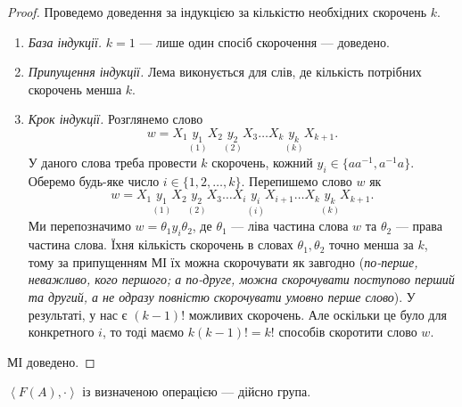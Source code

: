 \documentclass{math_library}
\begin{document}
\begin{proof}
Проведемо доведення за індукцією за кількістю необхідних скорочень $k$.
\begin{enumerate}[nosep,wide=0pt,label={\Roman*.}]
\item \textit{База індукції.} $k = 1$ --- лише один спосіб скорочення --- доведено.
\item \textit{Припущення індукції.} Лема виконується для слів, де кількість потрібних скорочень менша $k$.
\item \textit{Крок індукції.} Розглянемо слово
\[ 
w = X_1 \underset{(1)}{y_1} X_2 \underset{(2)}{y_2} X_3 \dots X_{k} \underset{(k)}{y_k} X_{k+1}.
\]
У даного слова треба провести $k$ скорочень, кожний $y_i \in \{aa^{-1}, a^{-1}a\}$. Оберемо будь-яке число $i \in \{1,2,\dots,k\}$. Перепишемо слово $w$ як
\[ 
w = X_1 \underset{(1)}{y_1} X_2 \underset{(2)}{y_2} X_3 \dots X_{i} \underset{(i)}{y_i} X_{i+1} \dots X_{k} \underset{(k)}{y_k} X_{k+1}.
\]
Ми перепозначимо $w = \theta_1 y_i \theta_2$, де $\theta_1$ --- ліва частина слова $w$ та $\theta_2$ --- права частина слова. Їхня кількість скорочень в словах $\theta_1,\theta_2$ точно менша за $k$, тому за припущенням МІ їх можна скорочувати як завгодно (\textit{по-перше, неважливо, кого першого; а по-друге, можна скорочувати поступово перший та другий, а не одразу повністю скорочувати умовно перше слово}). У результаті, у нас є $(k-1)!$ можливих скорочень. Але оскільки це було для конкретного $i$, то тоді маємо $k(k-1)! = k!$ способів скоротити слово $w$.
\end{enumerate}
МІ доведено.  
\end{proof}

\begin{proposition}
$\left< F(A), \cdot \right>$ із визначеною операцією --- дійсно група.
\end{proposition}
\end{document}
